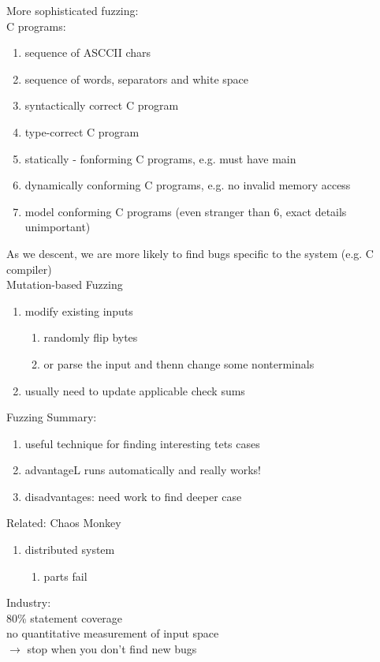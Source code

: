 \documentclass[10pt,usletter]{article}
\newcommand{\tab}[1][1cm]{\hspace*{#1}}
\begin{document}
More sophisticated fuzzing:\\
\tab C programs:
\begin{enumerate}
\item sequence of ASCCII chars
\item sequence of words, separators and white space
\item syntactically correct C program
\item type-correct C program
\item statically - fonforming C programs, e.g. must have main 
\item dynamically conforming C programs, e.g. no invalid memory access
\item model conforming C programs (even stranger than 6, exact details unimportant)
\end{enumerate} 
As we descent, we are more likely to find bugs specific to the system (e.g. C compiler)\\
Mutation-based Fuzzing
\begin{enumerate}
\item modify existing inputs
\begin{enumerate}
\item randomly flip bytes
\item or parse the input and thenn change some nonterminals
\end{enumerate}
\item usually need to update applicable check sums
\end{enumerate}
Fuzzing Summary:
\begin{enumerate}
\item useful technique for finding interesting tets cases
\item advantageL runs automatically and really works!
\item disadvantages: need work to find deeper case
\end{enumerate}
Related: Chaos Monkey
\begin{enumerate}
\item distributed system
\begin{enumerate}
\item parts fail
\end{enumerate}
\end{enumerate}
Industry:\\
\tab 80\% statement coverage\\
\tab no quantitative measurement of input space\\
\tab $\rightarrow$ stop when you don't find new bugs\\
\end{document}
